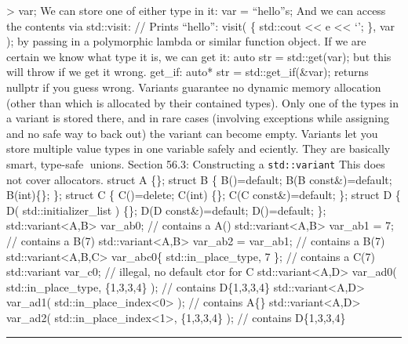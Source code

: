 \textgreater{} var; We can store one of either type in it: var =
``hello''s; And we can access the contents via std::visit: // Prints
``hello\n'': visit( \href{auto\&\&\%20e}{} \{ std::cout
\textless\textless{} e \textless\textless{} `\n'; \}, var ); by passing
in a polymorphic lambda or similar function object. If we are certain we
know what type it is, we can get it: auto str = std::get(var); but this
will throw if we get it wrong. get\_if: auto* str = std::get\_if(\&var);
returns nullptr if you guess wrong. Variants guarantee no dynamic memory
allocation (other than which is allocated by their contained types).
Only one of the types in a variant is stored there, and in rare cases
(involving exceptions while assigning and no safe way to back out) the
variant can become empty. Variants let you store multiple value types in
one variable safely and eciently. They are basically smart, type-safe
unions. Section 56.3: Constructing a
\passthrough{\lstinline!std::variant!} This does not cover allocators.
struct A \{\}; struct B \{ B()=default; B(B const\&)=default;
B(int)\{\}; \}; struct C \{ C()=delete; C(int) \{\}; C(C
const\&)=default; \}; struct D \{ D( std::initializer\_list ) \{\}; D(D
const\&)=default; D()=default; \};
std::variant\textless A,B\textgreater{} var\_ab0; // contains a A()
std::variant\textless A,B\textgreater{} var\_ab1 = 7; // contains a B(7)
std::variant\textless A,B\textgreater{} var\_ab2 = var\_ab1; // contains
a B(7) std::variant\textless A,B,C\textgreater{} var\_abc0\{
std::in\_place\_type, 7 \}; // contains a C(7) std::variant var\_c0; //
illegal, no default ctor for C std::variant\textless A,D\textgreater{}
var\_ad0( std::in\_place\_type, \{1,3,3,4\} ); // contains D\{1,3,3,4\}
std::variant\textless A,D\textgreater{} var\_ad1(
std::in\_place\_index\textless0\textgreater{} ); // contains A\{\}
std::variant\textless A,D\textgreater{} var\_ad2(
std::in\_place\_index\textless1\textgreater, \{1,3,3,4\} ); // contains
D\{1,3,3,4\}

\begin{center}\rule{0.5\linewidth}{0.5pt}\end{center}
